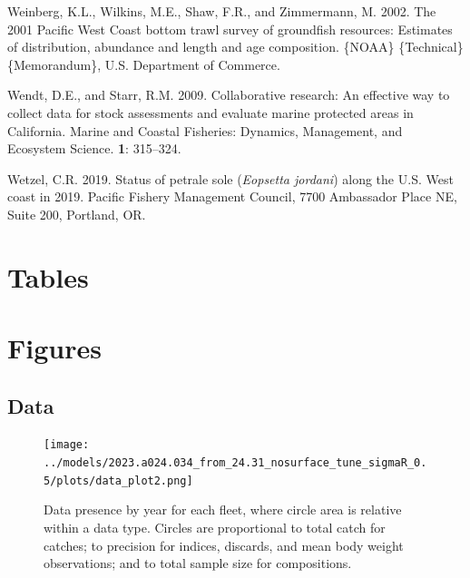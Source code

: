 \documentclass[11pt,
  english,
  letterpaper,
]{article}
\newlength{\cslhangindent}
\newenvironment{CSLReferences}[2] %
 {%
  \setlength{\parindent}{0pt}
  \ifodd #1 \everypar{\setlength{\hangindent}{\cslhangindent}}\ignorespaces\fi
  \ifnum #2 > 0
  \setlength{\parskip}{#2\baselineskip}
  \fi
 }%
 {}
\begin{document}
\begin{CSLReferences}{1}{0}
\leavevmode{}%
Weinberg, K.L., Wilkins, M.E., Shaw, F.R., and Zimmermann, M. 2002. The 2001 {Pacific} {West} {Coast} bottom trawl survey of groundfish resources: Estimates of distribution, abundance and length and age composition. \{NOAA\} \{Technical\} \{Memorandum\}, U.S. Department of Commerce.

\leavevmode{}%
Wendt, D.E., and Starr, R.M. 2009. Collaborative research: An effective way to collect data for stock assessments and evaluate marine protected areas in {C}alifornia. Marine and Coastal Fisheries: Dynamics, Management, and Ecosystem Science. \textbf{1}: 315--324.

\leavevmode{}%
Wetzel, C.R. 2019. Status of petrale sole (\emph{{Eopsetta} jordani}) along the {U}.{S}. West coast in 2019. Pacific Fishery Management Council, 7700 Ambassador Place NE, Suite 200, Portland, OR.

\end{CSLReferences}

\clearpage

\hypertarget{tables}{%
\section{Tables}\label{tables}}

\begin{landscape}\end{landscape}

\clearpage

\hypertarget{figures}{%
\section{Figures}\label{figures}}

\hypertarget{data-1}{%
\subsection{Data}\label{data-1}}

\begin{figure}
\centering
\texttt{[image: ../models/2023.a024.034\_from\_24.31\_nosurface\_tune\_sigmaR\_0.5/plots/data\_plot2.png]}
\caption{Data presence by year for each fleet, where circle area is relative within a data type. Circles are proportional to total catch for catches; to precision for indices, discards, and mean body weight observations; and to total sample size for compositions.\label{fig:data-plot}}
\end{figure}
\end{document}
